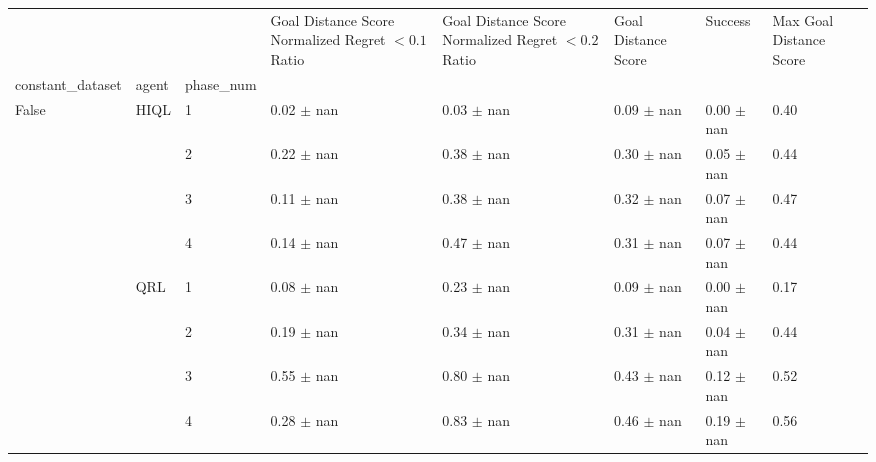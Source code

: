 \begin{tabular}{llllllll}
\toprule
 &  &  & Goal Distance Score Normalized Regret $< 0.1$ Ratio & Goal Distance Score Normalized Regret $< 0.2$ Ratio & Goal Distance Score & Success & Max Goal Distance Score \\
constant_dataset & agent & phase_num &  &  &  &  &  \\
\midrule
\multirow[t]{8}{*}{False} & \multirow[t]{4}{*}{HIQL} & 1 & 0.02 $\pm$ nan & 0.03 $\pm$ nan & 0.09 $\pm$ nan & 0.00 $\pm$ nan & 0.40 \\
 &  & 2 & 0.22 $\pm$ nan & 0.38 $\pm$ nan & 0.30 $\pm$ nan & 0.05 $\pm$ nan & 0.44 \\
 &  & 3 & 0.11 $\pm$ nan & 0.38 $\pm$ nan & 0.32 $\pm$ nan & 0.07 $\pm$ nan & 0.47 \\
 &  & 4 & 0.14 $\pm$ nan & 0.47 $\pm$ nan & 0.31 $\pm$ nan & 0.07 $\pm$ nan & 0.44 \\
\cline{2-8}
 & \multirow[t]{4}{*}{QRL} & 1 & 0.08 $\pm$ nan & 0.23 $\pm$ nan & 0.09 $\pm$ nan & 0.00 $\pm$ nan & 0.17 \\
 &  & 2 & 0.19 $\pm$ nan & 0.34 $\pm$ nan & 0.31 $\pm$ nan & 0.04 $\pm$ nan & 0.44 \\
 &  & 3 & 0.55 $\pm$ nan & 0.80 $\pm$ nan & 0.43 $\pm$ nan & 0.12 $\pm$ nan & 0.52 \\
 &  & 4 & 0.28 $\pm$ nan & 0.83 $\pm$ nan & 0.46 $\pm$ nan & 0.19 $\pm$ nan & 0.56 \\
\cline{1-8} \cline{2-8}
\bottomrule
\end{tabular}
